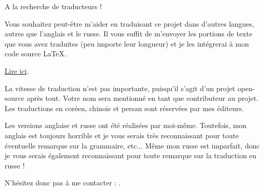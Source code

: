 ﻿\vspace*{\fill}

\Huge A la recherche de traducteurs !

\normalsize

\bigskip
\bigskip
\bigskip

Vous souhaitez peut-être m'aider en traduisant ce projet dans d'autres langues, autres que l'anglais et le russe.
Il vous suffit de m'envoyer les portions de texte que vous avez traduites (peu importe leur longueur) et je les intégrerai à mon code source LaTeX.

\href{https://github.com/dennis714/RE-for-beginners/blob/master/Translation.md}{Lire ici}.

La vitesse de traduction n'est pas importante, puisqu'il s'agit d'un projet open-source après tout.
Votre nom sera mentionné en tant que contributeur au projet.
Les traductions en coréen, chinois et persan sont réservées par mes éditeurs.

Les versions anglaise et russe ont été réalisées par moi-même.
Toutefois, mon anglais est toujours horrible et je vous serais très reconnaissant pour toute éventuelle remarque sur la grammaire, etc...
Même mon russe est imparfait, donc je vous serais également reconnaissant pour toute remarque sur la traduction en russe !%

N'hésitez donc pas à me contacter : \GTT{\EMAIL}.

\vspace*{\fill}
\vfill
